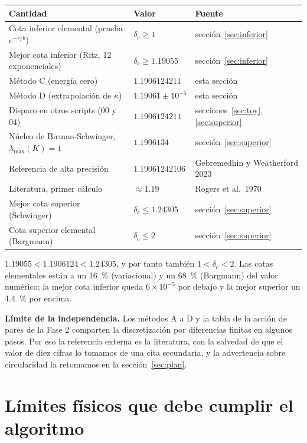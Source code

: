 \documentclass[11pt]{article}
\newcommand{\dc}{\delta_c}
\begin{document}
\begin{table}[H]
\centering
\small
\begin{tabular}{@{}lll@{}}
\toprule
\textbf{Cantidad} & \textbf{Valor} & \textbf{Fuente}\\
\midrule
Cota inferior elemental (prueba $e^{-r/b}$) & $\dc\ge1$ & sección~\ref{sec:inferior}\\
Mejor cota inferior (Ritz, 12 exponenciales) & $\dc\ge1.19055$ & sección~\ref{sec:inferior}\\
Método C (energía cero) & $1.1906124211$ & esta sección\\
Método D (extrapolación de $\kappa$) & $1.19061\pm10^{-5}$ & esta sección\\
Disparo en otros scripts (00 y 04) & $1.1906124211$ & secciones~\ref{sec:toy}, \ref{sec:superior}\\
Núcleo de Birman-Schwinger, $\lambda_{\max}(K)=1$ & $1.1906134$ & sección~\ref{sec:superior}\\
Referencia de alta precisión & $1.19061242106$ & Gebremedhin y Weatherford 2023\\
Literatura, primer cálculo & $\approx1.19$ & Rogers et al.\ 1970\\
Mejor cota superior (Schwinger) & $\dc\le1.24305$ & sección~\ref{sec:superior}\\
Cota superior elemental (Bargmann) & $\dc\le2$ & sección~\ref{sec:superior}\\
\bottomrule
\end{tabular}
\end{table}

$1.19055<1.1906124<1.24305$, y por tanto también $1<\dc<2$. Las cotas elementales están a un 16~\% (variacional) y un 68~\% (Bargmann) del valor numérico; la mejor cota inferior queda $6\times10^{-5}$ por debajo y la mejor superior un 4.4~\% por encima.

\textbf{Límite de la independencia.} Los métodos A a D y la tabla de la acción de pares de la Fase 2 comparten la discretización por diferencias finitas en algunos pasos. Por eso la referencia externa es la literatura, con la salvedad de que el valor de diez cifras lo tomamos de una cita secundaria, y la advertencia sobre circularidad la retomamos en la sección~\ref{sec:plan}.

\section{Límites físicos que debe cumplir el algoritmo}
\label{sec:limites}
\end{document}
